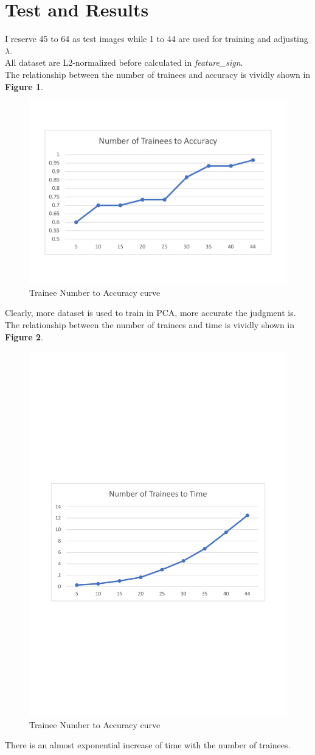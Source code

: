 \section{Test and Results}
I reserve 45 to 64 as test images while 1 to 44 are used for training and adjusting \(\lambda\). 
\\
All dataset are L2-normalized before calculated in \emph{feature\_sign}.
\\
The relationship between the number of trainees and accuracy is vividly shown in \textbf{Figure 1}.
\begin{figure}
	\centering
	\includegraphics[width=0.7\columnwidth,height=0.6\linewidth]{Trainee_to_Accuracy.pdf}
	\caption{Trainee Number to Accuracy curve}
\end{figure}
Clearly, more dataset is used to train in PCA, more accurate the judgment is.
\\
The relationship between the number of trainees and time is vividly shown in \textbf{Figure 2}.
\begin{figure}
	\centering
	\includegraphics[width=0.7\columnwidth,height=0.9\linewidth]{Trainee_to_Time.pdf}
	\caption{Trainee Number to Accuracy curve}
\end{figure}
There is an almost exponential increase of time with the number of trainees.
